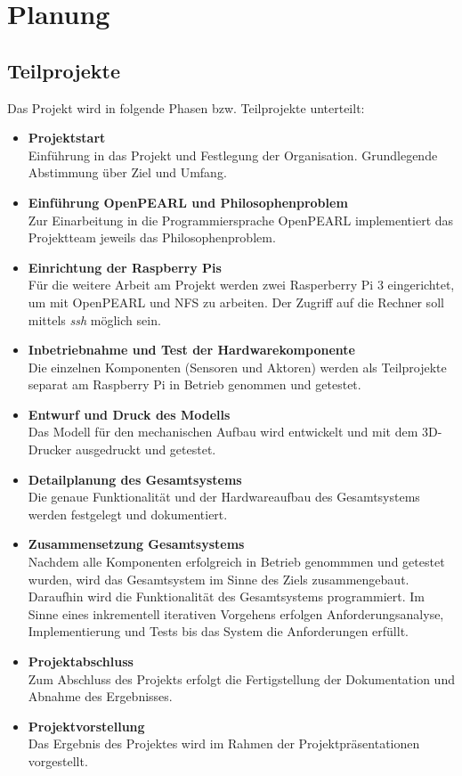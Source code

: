 \chapter{Planung}
	
	\section{Teilprojekte}
	Das Projekt wird in folgende Phasen bzw. Teilprojekte unterteilt:
	
	\begin{itemize}
		\item \textbf{Projektstart}\\
		Einführung in das Projekt und Festlegung der Organisation. Grundlegende Abstimmung über Ziel und Umfang.
		\item \textbf{Einführung OpenPEARL und Philosophenproblem}\\
		 Zur Einarbeitung in die Programmiersprache OpenPEARL implementiert das Projektteam jeweils das Philosophenproblem.
		\item \textbf{Einrichtung der Raspberry Pis}\\
		 Für die weitere Arbeit am Projekt werden zwei Rasperberry Pi 3 eingerichtet, um mit OpenPEARL und NFS zu arbeiten. Der Zugriff auf die Rechner soll mittels \emph{ssh} möglich sein.
		\item \textbf{Inbetriebnahme und Test der Hardwarekomponente}\\  Die einzelnen Komponenten (Sensoren und Aktoren) werden als Teilprojekte separat am Raspberry Pi in Betrieb genommen und getestet.
		\item \textbf{Entwurf und Druck des Modells}\\
		Das Modell für den mechanischen Aufbau wird entwickelt und mit dem 3D-Drucker ausgedruckt und getestet.
		\item \textbf{Detailplanung des Gesamtsystems}\\  Die genaue Funktionalität und der Hardwareaufbau des Gesamtsystems werden festgelegt und dokumentiert.
		\item \textbf{Zusammensetzung Gesamtsystems}\\
		 Nachdem alle Komponenten erfolgreich in Betrieb genommmen und getestet wurden, wird das Gesamtsystem im Sinne des Ziels zusammengebaut. Daraufhin wird die Funktionalität des Gesamtsystems programmiert. Im Sinne eines inkrementell iterativen Vorgehens erfolgen Anforderungsanalyse, Implementierung und Tests bis das System die Anforderungen erfüllt.
		 \item \textbf{Projektabschluss}\\
		 Zum Abschluss des Projekts erfolgt die Fertigstellung der Dokumentation und Abnahme des Ergebnisses.
		 \item \textbf{Projektvorstellung}\\
		 Das Ergebnis des Projektes wird im Rahmen der Projektpräsentationen vorgestellt.
	\end{itemize}

